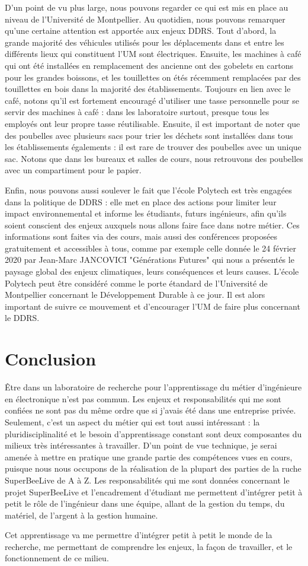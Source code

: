\documentclass[11pt,french,a4paper]{report}
\begin{document}
D'un point de vu plus large, nous pouvons regarder ce qui est mis en place au niveau de l'Université de Montpellier. 
Au quotidien, nous pouvons remarquer qu'une certaine attention est apportée aux enjeux DDRS. 
Tout d'abord, la grande majorité des véhicules utilisés pour les déplacements dans et entre les différents lieux qui constituent l'UM sont
électriques. Ensuite, les machines à café qui ont été installées en remplacement des ancienne ont des gobelets en cartons pour les 
grandes boissons, et les touillettes on étés récemment remplacées par des touillettes en bois dans la majorité des établissements. 
Toujours en lien avec le café, notons qu'il est fortement encouragé d'utiliser une tasse personnelle pour se servir des machines à café : 
dans les laboratoire surtout, presque tous les employés ont leur propre tasse réutilisable. 
Ensuite, il est important de noter que des poubelles avec plusieurs sacs pour trier les déchets sont installées dans tous les établissements 
égalements : il est rare de trouver des poubelles avec un unique sac. Notons que dans les bureaux et salles de cours, nous retrouvons des poubelles 
avec un compartiment pour le papier. 

Enfin, nous pouvons aussi soulever le fait que l'école Polytech est très engagées dans la politique de DDRS : elle met en place des 
actions pour limiter leur impact environnemental et informe les étudiants, futurs ingénieurs, afin qu'ils soient 
conscient des enjeux auxquels nous allons faire face dans notre métier. Ces informations sont faites via des cours, mais aussi 
des conférences proposées gratuitement et accessibles à tous, comme par exemple celle donnée le 24 février 2020 par Jean-Marc JANCOVICI 
"Générations Futures" qui nous a présentés le paysage global des enjeux climatiques, leurs conséquences et leurs causes. 
L'école Polytech peut être considéré comme le porte étandard de l'Université de Montpellier concernant le Développement Durable à ce jour. 
Il est alors important de suivre ce mouvement et d'encourager l'UM de faire plus concernant le DDRS. 


\chapter{Conclusion}
Être dans un laboratoire de recherche pour l'apprentissage du métier d'ingénieure en électronique n'est pas commun. Les enjeux et responsabilités 
qui me sont confiées ne sont pas du même ordre que si j'avais été dans une entreprise privée. Seulement, c'est un aspect du métier qui est tout aussi
intéressant : la pluridisciplinalité et le besoin d'apprentissage constant sont deux composantes du milieux très intéressantes à travailler. 
D'un point de vue technique, je serai amenée à mettre en pratique une grande partie des compétences vues en cours, puisque nous nous occupons de 
la réalisation de la plupart des parties de la ruche SuperBeeLive de A à Z. 
Les responsabilités qui me sont données concernant le projet SuperBeeLive et l'encadrement d'étudiant me permettent d'intégrer petit à petit le rôle de 
l'ingénieur dans une équipe, allant de la gestion du temps, du matériel, de l'argent à la gestion humaine. 

Cet apprentissage va me permettre d'intégrer petit à petit le monde de la recherche, me permettant de comprendre les enjeux, la façon de travailler, 
et le fonctionnement de ce milieu. 




\end{document}
